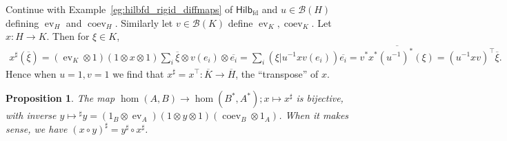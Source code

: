 \documentclass[a4paper,11pt]{article}
\theoremstyle{plain}
\newtheorem{proposition}{Proposition}[section]
\theoremstyle{remark}
\newenvironment{example}
  {\pushQED{\qed}\renewcommand{\qedsymbol}{$\triangle$}\examplex}
  {\popQED\endexamplex}
\newcommand{\mc}[1]{\mathcal{#1}}
\newcommand{\catHilbFD}{\textsf{Hilb}_{\text{fd}}}
\newcommand{\ev}{\operatorname{ev}}
\newcommand{\coev}{\operatorname{coev}}
\begin{document}
\begin{example}\label{eg:conj_Hilb}
Continue with Example~\ref{eg:hilbfd_rigid_diffmaps} of $\catHilbFD$ and $u\in\mc B(H)$ defining $\ev_H$ and $\coev_H$.  Similarly let $v\in\mc B(K)$ define $\ev_K, \coev_K$.  Let $x\colon H\to K$.  Then for $\xi\in K$,
\begin{align*}
x^\sharp(\overline\xi)
= (\ev_K\otimes 1)(1\otimes x\otimes 1)\sum_i \overline\xi \otimes v(e_i) \otimes \overline{e_i}
= \sum_i (\xi|u^{-1}xv(e_i)) \overline{e_i}
= \overline{v^*x^*(u^{-1})^*(\xi)}
= (u^{-1}xv)^\top \overline\xi.
\end{align*}
Hence when $u=1, v=1$ we find that $x^\sharp = x^\top \colon \overline K \to \overline H$, the ``transpose'' of $x$.
\end{example}

\begin{proposition}\label{prop:dual_morphism_properties}
The map $\hom(A,B) \to \hom(B^*, A^*); x \mapsto x^\sharp$ is bijective, with inverse $y \mapsto {}^\sharp y = (1_B\otimes\ev_A)(1\otimes y\otimes 1)(\coev_B\otimes 1_A)$.  When it makes sense, we have $(x\circ y)^\sharp = y^\sharp \circ x^\sharp$.
\end{proposition}
\end{document}
